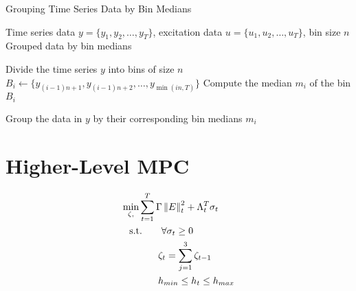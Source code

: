 \begin{algorithm}
	\caption{Grouping Time Series Data by Bin Medians}
	\begin{algorithmic}[1]
	\REQUIRE Time series data \( y = \{y_1, y_2, \ldots, y_T\} \), excitation data \( u = \{u_1, u_2, \ldots, u_T\} \), bin size \( n \)
	\ENSURE Grouped data by bin medians
	
	\STATE Divide the time series \( y \) into bins of size \( n \)
		\STATE $B_i \gets \{ y_{(i-1)n+1}, y_{(i-1)n+2}, \ldots, y_{\min(in, T)} \}$
		\STATE Compute the median \( m_i \) of the bin \( B_i \)
	\ENDFOR
	
	\STATE Group the data in \( y \) by their corresponding bin medians \( m_i \)
	
	\end{algorithmic}
	\end{algorithm}


	\section{Higher-Level MPC}
	\begin{subequations}\label{P2:FinalModel}
		\begin{align}
			\underset{\zeta, }{\text{min}}& \sum_{t=1}^{T} \Gamma \left\lVert E \right\rVert^{2}_{t} + \Lambda_t^T \sigma_t   \label{P2:0} \\
			&\hspace{-1em} \text{s.t.}  \quad \quad \forall \sigma_t \geq 0 \label{L1:0} \\
			& \qquad \zeta_{t} = \sum_{j=1}^3 \zeta_{t-1} \label{L1:1}  \\
			& \qquad h_{min}\leq h_{t} \leq h_{max}\label{L1:2}
	\end{align}
	\end{subequations}


